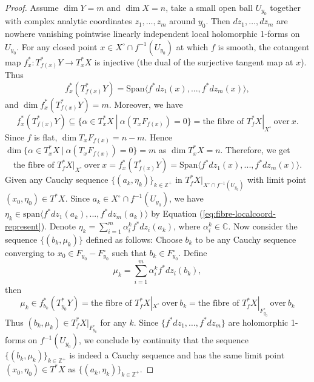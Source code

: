 \documentclass[a4paper,12pt,reqno]{amsart}
\newtheorem{theorem}{Theorem}[section]
\theoremstyle{question}
\theoremstyle{definition}
\theoremstyle{remark}
\theoremstyle{cited}
\theoremstyle{citeddef}
\def\phi{{\varphi}}
\begin{document}
\begin{proof}
Assume $\dim Y = m$ and $\dim X=n$, take a small open ball $U_{y_0}$ together with complex analytic coordinates $z_1, \ldots, z_m$ around $y_0$. Then $dz_1, \ldots, dz_m$ are nowhere vanishing pointwise linearly independent local holomorphic 1-forms on $U_{y_0}$. For any closed point $x\in X^\circ\cap f^{-1}(U_{y_0})$ at which $f$ is smooth, the cotangent map $f^*_x\colon T^*_{f(x)}Y\to T^*_xX$ is injective (the dual of the surjective tangent map at $x$). Thus $$f^*_x(T_{f(x)}^*Y)=\text{Span}\langle f^*dz_1(x),...,f^*dz_m(x)\rangle,$$ and $\dim f^*_x(T_{f(x)}^*Y)=m$. Moreover, we have $$f^*_x(T_{f(x)}^*Y)\subseteq\{\alpha\in T^*_xX\ |\ \alpha(T_xF_{f(x)})=0\}=\text{the fibre of\ }T_f^*X|_{X^{\circ}}\ \text{over} \ x.$$ Since $f$ is flat, $\dim T_xF_{f(x)}=n-m$. Hence $\dim \{\alpha\in T^*_xX\ |\ \alpha(T_xF_{f(x)})=0\}=m$ as $\dim T^*_xX=n$.
Therefore, we get 
\begin{equation}\label{eq:fibre-localcoord-represent}
  \text{the fibre of\ }T_f^*X|_{X^{\circ}}\ \text{over} \ x=f^*_x(T_{f(x)}^*Y)=\text{Span}\langle f^*dz_1(x),...,f^*dz_m(x)\rangle.  
\end{equation}
Given any Cauchy sequence $\{(a_k,\eta_k)\}_{k\in \mathbb{Z}^+}$ in $T_f^*X|_{X^\circ \cap f^{-1}(U_{y_0})}$ with limit point $(x_0, \eta_0)\in T^*X$. Since $a_k\in X^\circ \cap f^{-1}(U_{y_0})$, we have $\eta_k \in \text{span}\langle f^*dz_1(a_k),...,f^*dz_m(a_k)\rangle$ by Equation (\ref{eq:fibre-localcoord-represent}). Denote $\eta_k = \sum_{i=1}^m \alpha_i^k f^*dz_i(a_k)$, where $\alpha_i^k\in\mathbb{C}$. Now consider the sequence $\{(b_k,\mu_k)\}$ defined as follows: Choose $b_k$ to be any Cauchy sequence converging to $x_0\in F_{y_0}-F^\circ_{y_0}$ such that $b_k\in F^{\circ}_{y_0}$. Define $$\mu_k = \sum_{i=1}^m \alpha_i^k f^*dz_i(b_k),$$ then $$\mu_k\in f^*_{b_k}(T^*_{y_0}Y)=\text{the fibre of\ }T_f^*X|_{X^{\circ}}\ \text{over} \ b_k=\text{the fibre of\ }T_f^*X|_{F^\circ_{y_0}}\ \text{over} \ b_k$$
Thus $(b_k,\mu_k)\in T_f^*X|_{F^\circ_{y_0}}$ for any $k$. Since $\{f^*dz_1, \ldots, f^*dz_m\}$ are holomorphic 1-forms on $f^{-1}(U_{y_0})$, we conclude by continuity that the sequence $\{(b_k,\mu_k)\}_{k\in\mathbb{Z}^+}$ is indeed a Cauchy sequence and has the same limit point $(x_0, \eta_0)\in T^*X$ as $\{(a_k,\eta_k)\}_{k\in\mathbb{Z}^+}$.
\end{proof}

\end{document}
